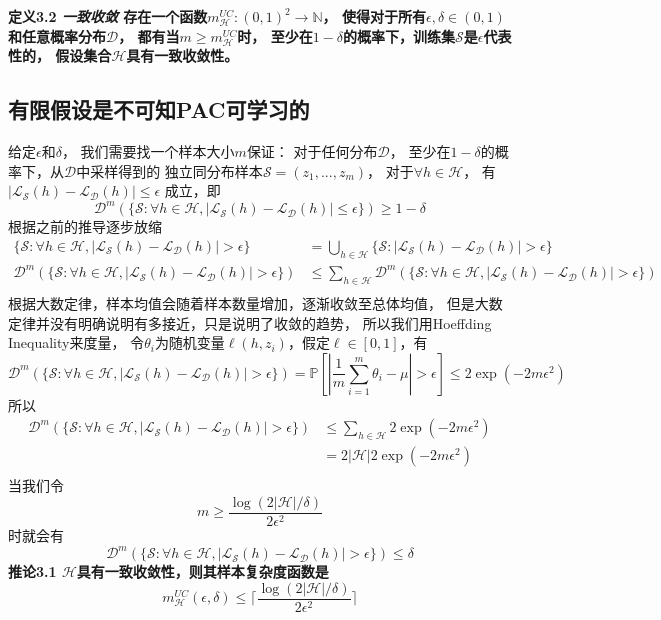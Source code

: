 \documentclass[UTF8]{ctexart}
\begin{document}
\textbf{
定义3.2 
\textit{一致收敛}
存在一个函数$m_{\mathcal{H}}^{UC}:(0,1)^2\rightarrow\mathbb{N}$，
使得对于所有$\epsilon,\delta\in(0,1)$和任意概率分布$\mathcal{D}$，
都有当$m\geq m_\mathcal{H}^{UC}$时，
至少在$1-\delta$的概率下，训练集$\mathcal{S}$是$\epsilon$代表性的，
假设集合$\mathcal{H}$具有一致收敛性。
}

\subsection{有限假设是不可知PAC可学习的}
给定$\epsilon$和$\delta$，
我们需要找一个样本大小$m$保证：
对于任何分布$\mathcal{D}$，
至少在$1-\delta$的概率下，从$\mathcal{D}$中采样得到的
独立同分布样本$\mathcal{S}=(z_1,...,z_m)$，
对于$\forall h\in\mathcal{H}$，
有$|\mathcal{L}_{\mathcal{S}}(h)-\mathcal{L}_{\mathcal{D}}(h)|\leq \epsilon$
成立，即
$$
\mathcal{D}^m(
\{\mathcal{S}:\forall h\in\mathcal{H},
|\mathcal{L}_{\mathcal{S}}(h)-\mathcal{L}_{\mathcal{D}}(h)|\leq \epsilon\}
)\geq 1-\delta
$$
根据之前的推导逐步放缩
$$
\begin{aligned}
\{\mathcal{S}:\forall h\in\mathcal{H},
|\mathcal{L}_{\mathcal{S}}(h)-\mathcal{L}_{\mathcal{D}}(h)|> \epsilon\}
 &= \bigcup_{h\in\mathcal{H}} 
\{\mathcal{S}:|\mathcal{L}_{\mathcal{S}}(h)-\mathcal{L}_{\mathcal{D}}(h)|> \epsilon \}\\
\mathcal{D}^m(
\{\mathcal{S}:\forall h\in\mathcal{H},
|\mathcal{L}_{\mathcal{S}}(h)-\mathcal{L}_{\mathcal{D}}(h)|> \epsilon\}
)&\leq
\sum_{h\in\mathcal{H}}\mathcal{D}^m(\{\mathcal{S}:\forall h\in\mathcal{H},
|\mathcal{L}_{\mathcal{S}}(h)-\mathcal{L}_{\mathcal{D}}(h)|> \epsilon\})\\
\end{aligned}
$$
根据大数定律，样本均值会随着样本数量增加，逐渐收敛至总体均值，
但是大数定律并没有明确说明有多接近，只是说明了收敛的趋势，
所以我们用Hoeffding Inequality来度量，
令$\theta_i$为随机变量$\ell(h,z_i)$，假定$\ell\in[0,1]$，有
$$
\mathcal{D}^m(\{\mathcal{S}:\forall h\in\mathcal{H},
|\mathcal{L}_{\mathcal{S}}(h)-\mathcal{L}_{\mathcal{D}}(h)|> \epsilon\})=
\mathbb{P}[|\frac{1}{m}\sum^m_{i=1}\theta_i-\mu|>\epsilon]\leq
2\exp(-2m\epsilon^2)
$$
所以
$$
\begin{aligned}
\mathcal{D}^m(
\{\mathcal{S}:\forall h\in\mathcal{H},
|\mathcal{L}_{\mathcal{S}}(h)-\mathcal{L}_{\mathcal{D}}(h)|> \epsilon\}
)&\leq
\sum_{h\in\mathcal{H}}2\exp(-2m\epsilon^2)\\
&= 2|\mathcal{H}|2\exp(-2m\epsilon^2)\\
\end{aligned}
$$
当我们令
$$
m\geq \frac{\log(2|\mathcal{H}|/\delta)}{2\epsilon^2}
$$
时就会有
$$
\mathcal{D}^m(
\{\mathcal{S}:\forall h\in\mathcal{H},
|\mathcal{L}_{\mathcal{S}}(h)-\mathcal{L}_{\mathcal{D}}(h)|> \epsilon\}
)\leq \delta
$$
\textbf{
推论3.1
$\mathcal{H}$具有一致收敛性，则其样本复杂度函数是
$$
m^{UC}_{\mathcal{H}}(\epsilon,\delta)\leq 
\lceil \frac{\log(2|\mathcal{H}|/\delta)}{2\epsilon^2} \rceil
$$
}
\end{document}
